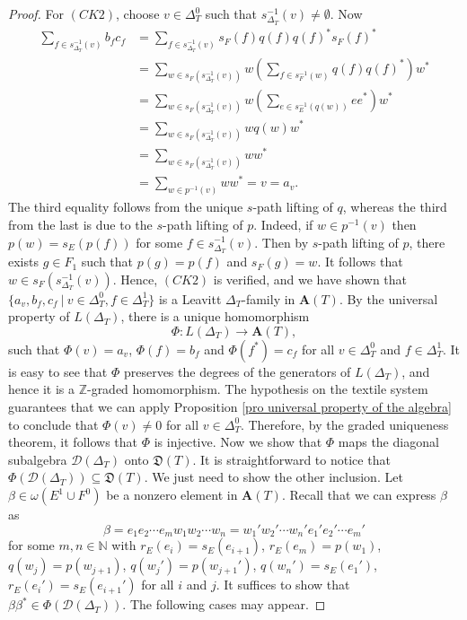 \documentclass[a4paper,reqno,12pt]{amsart}
\theoremstyle{definition}
\theoremstyle{remark}
\begin{document}
\begin{proof}
For $(CK2)$, choose $v\in \Delta_T^0$ such that $s_{\Delta_T}^{-1}(v)\neq \emptyset$. Now 
\allowdisplaybreaks
{\begin{align*}
\displaystyle{\sum_{f\in s_{\Delta_T}^{-1}(v)}} b_f c_f &= \displaystyle{\sum_{f\in s_{\Delta_T}^{-1}(v)}} s_F(f)q(f)q(f)^*s_F(f)^*\\
&= \displaystyle{\sum_{w\in s_F(s_{\Delta_T}^{-1}(v))}}w\left(\displaystyle{\sum_{f\in s_F^{-1}(w)}}q(f)q(f)^*\right)w^*\\
&= \displaystyle{\sum_{w\in s_F(s_{\Delta_T}^{-1}(v))}} w \left(\displaystyle{\sum_{e\in s_E^{-1}(q(w))}} ee^*\right) w^*\\
&= \displaystyle{\sum_{w\in s_F(s_{\Delta_T}^{-1}(v))}} w q(w) w^*\\
&= \displaystyle{\sum_{w\in s_F(s_{\Delta_T}^{-1}(v))}} ww^*\\
&= \displaystyle{\sum_{w\in p^{-1}(v)}}ww^*=v=a_v.
\end{align*}
}
The third equality follows from the unique $s$-path lifting of $q$, whereas the third from the last is due to the $s$-path lifting of $p$. Indeed, if $w\in p^{-1}(v)$ then $p(w)=s_E(p(f))$ for some $f\in s_{\Delta_T}^{-1}(v)$. Then by $s$-path lifting of $p$, there exists $g\in F_1$ such that $p(g)=p(f)$ and $s_F(g)=w$. It follows that $w\in s_F(s_{\Delta_T}^{-1}(v))$. Hence, $(CK2)$ is verified, and we have shown that $\{a_v,b_f,c_f~|~v\in \Delta_T^0,f\in \Delta_T^1\}$ is a Leavitt $\Delta_T$-family in $\mathbf{A}(T)$. By the universal property of $L(\Delta_T)$, there is a unique homomorphism \[\Phi:L(\Delta_T)\longrightarrow \mathbf{A}(T),\] such that $\Phi(v)=a_v$, $\Phi(f)=b_f$ and $\Phi(f^*)=c_f$ for all $v\in \Delta_T^0$ and $f\in \Delta_T^1$. It is easy to see that $\Phi$ preserves the degrees of the generators of $L(\Delta_T)$, and hence it is a $\mathbb{Z}$-graded homomorphism. The hypothesis on the textile system guarantees that we can apply Proposition \ref{pro universal property of the algebra} to conclude that $\Phi(v)\neq 0$ for all $v\in \Delta_T^0$. Therefore, by the graded uniqueness theorem, it follows that $\Phi$ is injective. Now we show that $\Phi$ maps the diagonal subalgebra $\mathcal{D}(\Delta_T)$ onto $\mathfrak{D}(T)$. It is straightforward to notice that $\Phi(\mathcal{D}(\Delta_T))\subseteq \mathfrak{D}(T)$. We just need to show the other inclusion. Let $\beta\in \omega(E^1\cup F^0)$ be a nonzero element in $\mathbf{A}(T)$. Recall that we can express $\beta$ as 
\begin{equation}\label{eq form of beta}
\beta=e_1e_2\cdots e_m w_1 w_2\cdots w_n=w_1' w_2'\cdots w_n' e_1' e_2'\cdots e_m'   
\end{equation}
for some $m,n\in \mathbb{N}$ with $r_E(e_i)=s_E(e_{i+1})$, $r_E(e_m)=p(w_1)$, $q(w_j)=p(w_{j+1})$, $q(w_j')=p(w_{j+1}')$, $q(w_n')=s_E(e_1')$, $r_E(e_i')=s_E(e_{i+1}')$ for all $i$ and $j$. It suffices to show that $\beta\beta^*\in \Phi(\mathcal{D}(\Delta_T))$. The following cases may appear.


\end{proof}
\end{document}
